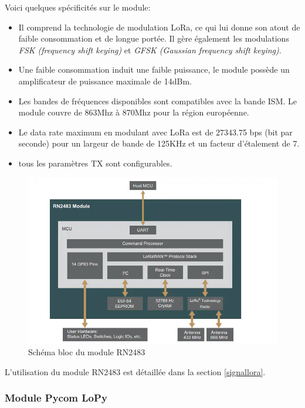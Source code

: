 Voici quelques spécificités sur le module:
\vspace{0.1cm}

\begin{itemize}
\item Il comprend la technologie de modulation LoRa, ce qui lui donne son atout de faible consommation et de longue portée. Il gère également les modulations \textit{FSK (frequency shift keying)} et \textit{GFSK (Gaussian frequency shift keying)}.
\item Une faible consommation induit une faible puissance, le module possède un amplificateur de puissance maximale de 14dBm.
\item Les bandes de fréquences disponibles sont compatibles avec la bande ISM. Le module couvre de 863Mhz à 870Mhz pour la région européenne.
\item Le data rate maximum en modulant avec LoRa est de 27343.75 bps (bit par seconde) pour un largeur de bande de 125KHz et un facteur d'étalement de 7.
\item tous les paramètres TX sont configurables.
\end{itemize}


\begin{figure}[h]
\centering

\includegraphics[scale=0.8]{images/SBrn2483.png}
\caption{Schéma bloc du module RN2483}\label{term3002}
\end{figure}

L'utilisation du module RN2483 est détaillée dans la section \ref{signallora}.

\subsubsection{Module Pycom LoPy}



